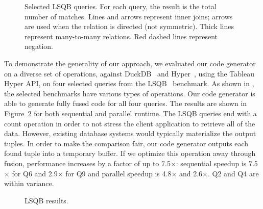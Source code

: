 \documentclass[acmsmall,screen,nonacm]{acmart}\settopmatter{printfolios=true,printccs=false,printacmref=false}
\begin{document}
\begin{figure}
    \caption{Selected LSQB queries. For each query, the result is the total number
    of matches. Lines and arrows represent inner joins; arrows are used when the relation is directed (not symmetric).
    Thick lines represent many-to-many relations. Red dashed lines represent negation.}
    \label{fig:lsqb-diagram}
    \vspace{-1em}
\end{figure}

To demonstrate the generality of our approach, we evaluated our code generator on a diverse set of operations, against DuckDB~\cite{duckdb} and Hyper~\cite{hyper}, using the Tableau Hyper API, on four selected queries from the LSQB~\cite{lsqb} benchmark. As shown in , the selected benchmarks have various types of operations. Our code generator is able to generate fully fused code for all four queries. The results are shown in Figure~\ref{fig:lsqb} for both sequential and parallel runtime.
The LSQB queries end with a count operation in order to not stress the client application to retrieve all of the data. However, existing database systems would typically materialize the output tuples.
In order to make the comparison fair, our code generator outputs each found tuple into a temporary buffer. If we optimize this operation away through fusion, performance increases by a factor of up to 7.5$\times$: sequential speedup is 7.5$\times$ for Q6 and 2.9$\times$ for Q9 and parallel speedup is 4.8$\times$ and 2.6$\times$. Q2 and Q4 are within variance.

\begin{figure}
    \centering
    
    \vspace{-2em}\caption{LSQB results.}
    \label{fig:lsqb}
    \vspace{-2em}
\end{figure}
\end{document}
